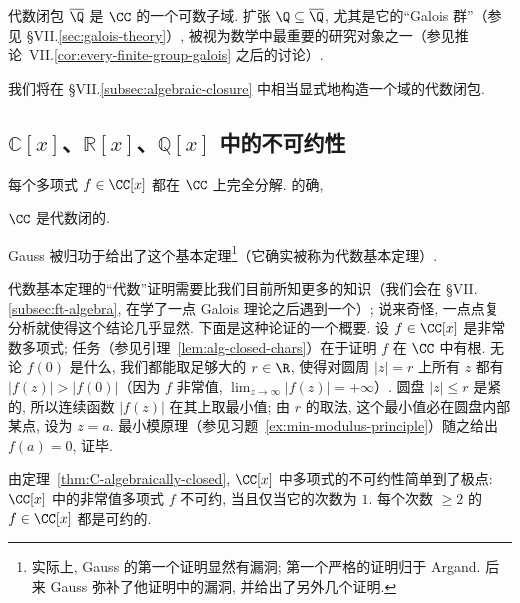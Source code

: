 代数闭包 $\overline{\Q}$ 是 $\CC$ 的一个可数子域. 扩张 $\Q\subseteq\overline{\Q}$, 尤其是它的``Galois 群''（参见 \S VII.\ref{sec:galois-theory}）, 被视为数学中最重要的研究对象之一（参见推论~VII.\ref{cor:every-finite-group-galois} 之后的讨论）.

我们将在 \S VII.\ref{subsec:algebraic-closure} 中相当显式地构造一个域的代数闭包.

\subsection{\texorpdfstring{$\mathbb{C}[x]$}{C[x]}、\texorpdfstring{$\mathbb{R}[x]$}{R[x]}、\texorpdfstring{$\mathbb{Q}[x]$}{Q[x]} 中的不可约性}
\label{subsec:irred-CRQ}

每个多项式 $f\in\CC[x]$ 都在 $\CC$ 上完全分解. 的确,

\begin{theorem}\label{thm:C-algebraically-closed}
$\CC$ 是代数闭的.
\end{theorem}

Gauss 被归功于给出了这个基本定理\footnote{实际上, Gauss 的第一个证明显然有漏洞; 第一个严格的证明归于 Argand. 后来 Gauss 弥补了他证明中的漏洞, 并给出了另外几个证明.}（它确实被称为代数基本定理）.

代数基本定理的``代数''证明需要比我们目前所知更多的知识（我们会在 \S VII.\ref{subsec:ft-algebra}, 在学了一点 Galois 理论之后遇到一个）; 说来奇怪, 一点点复分析就使得这个结论几乎显然. 下面是这种论证的一个概要. 设 $f\in\CC[x]$ 是非常数多项式; 任务（参见引理~\ref{lem:alg-closed-chars}）在于证明 $f$ 在 $\CC$ 中有根. 无论 $f(0)$ 是什么, 我们都能取足够大的 $r\in\R$, 使得对圆周 $|z|=r$ 上所有 $z$ 都有 $|f(z)|>|f(0)|$（因为 $f$ 非常值, $\lim_{z\to\infty}|f(z)|=+\infty$）. 圆盘 $|z|\leq r$ 是紧的, 所以连续函数 $|f(z)|$ 在其上取最小值; 由 $r$ 的取法, 这个最小值必在圆盘内部某点, 设为 $z=a$. 最小模原理（参见习题~\ref{ex:min-modulus-principle}）随之给出 $f(a)=0$, 证毕.

由定理~\ref{thm:C-algebraically-closed}, $\CC[x]$ 中多项式的不可约性简单到了极点: $\CC[x]$ 中的非常值多项式 $f$ 不可约, 当且仅当它的次数为 $1$. 每个次数 $\geq 2$ 的 $f\in\CC[x]$ 都是可约的.

